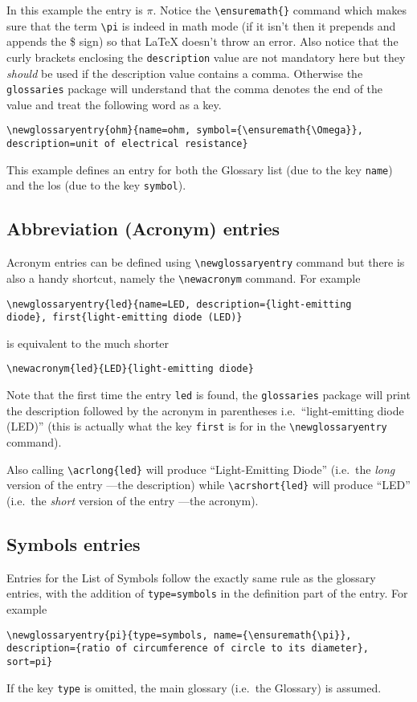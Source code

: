 In this example the entry is $\pi$. Notice the \texttt{\textbackslash ensuremath\{\}} command which makes sure that the term \texttt{\textbackslash pi} is indeed in math mode (if it isn't then it prepends and appends the \$ sign) so that LaTeX doesn't throw an error. Also notice that the curly brackets enclosing the \texttt{description} value are not mandatory here but they \emph{should} be used if the description value contains a comma. Otherwise the \texttt{glossaries} package will understand that the comma denotes the end of the value and treat the following word as a key. 
\begin{lstlisting}
\newglossaryentry{ohm}{name=ohm, symbol={\ensuremath{\Omega}},
description=unit of electrical resistance}
\end{lstlisting}

This example defines an entry for both the Glossary list (due to the key \texttt{name}) and the \gls{los} (due to the key \texttt{symbol}).

\subsection{Abbreviation (Acronym) entries}
Acronym entries can be defined using \texttt{\textbackslash newglossaryentry} command but there is also a handy shortcut, namely the \texttt{\textbackslash newacronym} command. For example
\begin{lstlisting}
\newglossaryentry{led}{name=LED, description={light-emitting 
diode}, first{light-emitting diode (LED)}
\end{lstlisting}
is equivalent to the much shorter 
\begin{lstlisting}
\newacronym{led}{LED}{light-emitting diode}
\end{lstlisting}
Note that the first time the entry \texttt{led} is found, the \texttt{glossaries} package will print the description followed by the acronym in parentheses i.e.\ ``light-emitting diode (LED)'' (this is actually what the key \texttt{first} is for in the \texttt{\textbackslash newglossaryentry} command).

Also calling \texttt{\textbackslash acrlong\{led\}} will produce ``Light-Emitting Diode'' (i.e.\ the \emph{long} version of the entry ---the description) while \texttt{\textbackslash acrshort\{led\}} will produce ``LED'' (i.e.\ the \emph{short} version of the entry ---the acronym).

\subsection{Symbols entries}
Entries for the List of Symbols follow the exactly same rule as the glossary entries, with the addition of \texttt{type=symbols} in the definition part of the entry. For example
\begin{lstlisting}
\newglossaryentry{pi}{type=symbols, name={\ensuremath{\pi}},
description={ratio of circumference of circle to its diameter}, 
sort=pi}
\end{lstlisting}
If the key \texttt{type} is omitted, the main glossary (i.e.\ the Glossary) is assumed.

